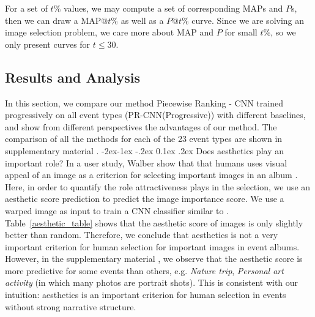 \documentclass[10pt,twocolumn,letterpaper]{article}
\makeatletter
\renewcommand\subsubsection{\@startsection{subsubsection}{3}{\z@}%
                {-2ex\@plus -1ex \@minus -.2ex}%
                {0.1ex \@plus .2ex}%
                {\normalfont\normalsize\bfseries}}
\makeatother
\begin{document}
For a set of $t\%$ values, we may compute a set of corresponding $\text{MAP}$s and $P$s, then we can draw a  $\text{MAP} @ t\%$  as well as a $P@t\%$ curve. Since we are solving an image selection problem, we care more about MAP and $P$ for small $t\%$, so we only present curves for $t \leq 30$.


\subsection{Results and Analysis}
In this section, we compare our method Piecewise Ranking - CNN trained progressively on all event types (PR-CNN(Progressive)) with different baselines, and show from different perspectives the advantages of our method. The comparison of all the methods for each of the 23 event types are shown in supplementary material \cite{supplementary}. 
\subsubsection{Does aesthetics play an important role?}
In a user study, Walber \etal show that that humans uses visual appeal of an image as a criterion for selecting important images in an album \cite{gaze}. Here, in order to quantify the role attractiveness plays in the selection, we use an aesthetic score prediction to predict the image importance score. We use a warped image as input to train a CNN classifier similar to \cite{aesthe_14}. Table~\ref{aesthetic_table} shows that the aesthetic score of images is only slightly better than random. Therefore, we conclude that aesthetics is not a very important criterion for human selection for important images in event albums. However, in the supplementary material \cite{supplementary}, we observe that the aesthetic score is more predictive for some events than others, e.g. \textit{Nature trip}, \textit{Personal art activity} (in which many photos are portrait shots). This is consistent with our intuition: aesthetics is an important criterion for human selection in events without strong narrative structure.
\end{document}

